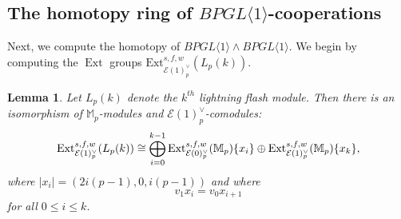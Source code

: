 \documentclass{amsart}
\newtheorem{lemma}[theorem]{Lemma}
\theoremstyle{plain}
\numberwithin{theorem}{section}
\numberwithin{equation}{section}
\numberwithin{figure}{section}
\DeclareMathOperator{\Ext}{Ext}
\newcommand{\0}{\langle 0 \rangle }
\begin{document}
\subsection{The homotopy ring of $BPGL \langle 1 \rangle$-cooperations}
Next, we compute the homotopy of $BPGL \langle 1 \rangle \wedge BPGL \langle 1 \rangle.$ We begin by computing the $\Ext$ groups $\text{Ext}^{s,f,w}_{\mathcal{E}(1)^\vee_p}(L_p(k))$.
\begin{lemma}
\label{lem:lightning flash ext 1}
    Let $L_p(k)$ denote the $k^{th}$ lightning flash module. Then there is an isomorphism of $\mathbb{M}_p$-modules and $\mathcal{E}(1)_p^\vee$-comodules:
    \[\textup{Ext}^{s,f,w}_{\mathcal{E}(1)_p^\vee}(L_p(k)) \cong \bigoplus_{i=0}^{k-1}\textup{Ext}^{s,f,w}_{\mathcal{E}(0)_p^\vee}(\mathbb{M}_p)\{x_i\} \oplus \textup{Ext}^{s,f,w}_{\mathcal{E}(1)_p^\vee}(\mathbb{M}_p) \{x_k\},\]
    where $|x_i|=(2i(p-1), 0, i(p-1))$ and where \[v_1x_i = v_0x_{i+1}\]
    for all $0 \leq i \leq k$.
\end{lemma}
\end{document}
